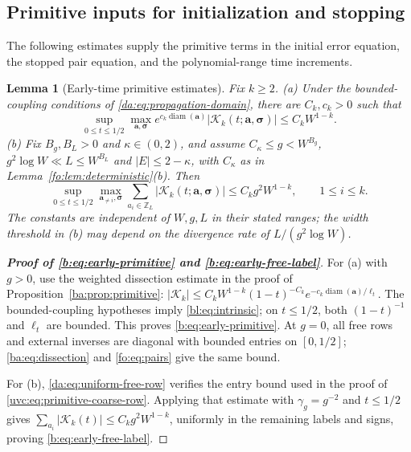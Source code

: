 \documentclass[11pt]{article}
\numberwithin{equation}{section}
\newtheorem{lemma}[theorem]{Lemma}
\theoremstyle{remark}
\newcommand{\Z}{\mathbb Z}
\newcommand{\diam}{\operatorname{diam}}
\newcommand{\cK}{\mathcal K}
\begin{document}
\subsection{Primitive inputs for initialization and stopping}
\label{app:primitive-stochastic-inputs}
The following estimates supply the primitive terms in the initial error
equation, the stopped pair equation, and the polynomial-range time increments.

\begin{lemma}[Early-time primitive estimates]\label{b:lem:early-primitive}
Fix $k\ge2$.
\textup{(a)} Under the bounded-coupling conditions of
\eqref{da:eq:propagation-domain}, there are $C_k,c_k>0$ such that
\begin{equation}\label{b:eq:early-primitive}
 \sup_{0\le t\le1/2}\max_{\boldsymbol a,\boldsymbol\sigma}
 e^{c_k\diam(\boldsymbol a)}
 |\cK_k(t;\boldsymbol a,\boldsymbol\sigma)|\le C_kW^{1-k}.
\end{equation}
\textup{(b)} Fix $B_g,B_L>0$ and $\kappa\in(0,2)$, and assume
$C_\kappa\le g<W^{B_g}$, $g^2\log W\ll L\le W^{B_L}$ and
$|E|\le2-\kappa$, with $C_\kappa$ as in
Lemma~\ref{fo:lem:deterministic}\textup{(b)}. Then
\begin{equation}\label{b:eq:early-free-label}
 \sup_{0\le t\le1/2}\max_{\boldsymbol a_{\ne i},\boldsymbol\sigma}
 \sum_{a_i\in\Z_L}|\cK_k(t;\boldsymbol a,\boldsymbol\sigma)|
 \le C_kg^2W^{1-k},\qquad 1\le i\le k.
\end{equation}
The constants are independent of $W,g,L$ in their stated ranges; the
width threshold in \textup{(b)} may depend on the divergence rate of
$L/(g^2\log W)$.
\end{lemma}
\begin{proof}[\textbf{Proof of \eqref{b:eq:early-primitive} and
\eqref{b:eq:early-free-label}}]
For \textup{(a)} with $g>0$, use the weighted dissection estimate
in the proof of Proposition~\ref{ba:prop:primitive}:
$|\cK_k|\le C_kW^{1-k}(1-t)^{-C_k}
e^{-c_k\diam(\boldsymbol a)/\ell_t}$.
The bounded-coupling hypotheses imply \eqref{bl:eq:intrinsic};
on $t\le1/2$, both $(1-t)^{-1}$ and $\ell_t$ are bounded.
This proves \eqref{b:eq:early-primitive}. At $g=0$, all free rows and
external inverses are diagonal with bounded entries on $[0,1/2]$;
\eqref{ba:eq:dissection} and \eqref{fo:eq:pairs} give the same bound.

For \textup{(b)}, \eqref{da:eq:uniform-free-row} verifies the entry
bound used in the proof of \eqref{uvc:eq:primitive-coarse-row}.
Applying that estimate with $\gamma_g=g^{-2}$ and $t\le1/2$ gives
$\sum_{a_i}|\cK_k(t)|\le C_kg^2W^{1-k}$, uniformly in the remaining
labels and signs, proving \eqref{b:eq:early-free-label}.
\end{proof}
\end{document}

